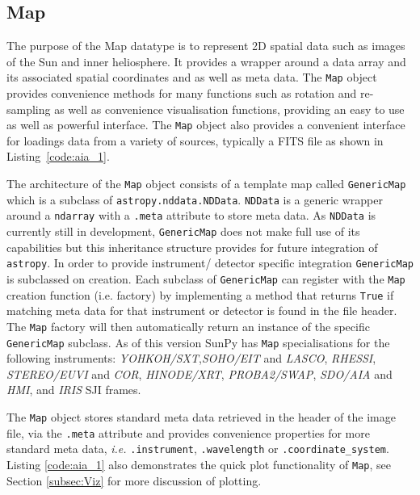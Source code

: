 \subsection{Map}
The purpose of the Map datatype is to represent 2D spatial data such as images of the Sun and 
inner heliosphere. It provides a wrapper around a data array and its associated
spatial coordinates and as well as meta data. The \texttt{Map} object provides 
convenience methods for many functions 
such as rotation and re-sampling as well as convenience visualisation 
functions, providing an easy to use as well as powerful interface. The \texttt{Map} object
also provides a convenient interface for loadings data from a variety of sources, typically
a FITS file as shown in Listing~\ref{code:aia_1}.

The architecture of the \texttt{Map} object consists of a template map called
\texttt{GenericMap} which is a subclass of \texttt{astropy.nddata.NDData}. \texttt{NDData} is a 
generic wrapper around a \texttt{ndarray} with a \texttt{.meta} attribute to store meta data.
As \texttt{NDData} is currently still in development, \texttt{GenericMap} does not make full
use of its capabilities but this inheritance structure provides 
for future integration of \texttt{astropy}. In order to provide instrument/
detector specific integration \texttt{GenericMap} is subclassed on creation. 
Each subclass of \texttt{GenericMap} can register with the \texttt{Map} creation function (i.e. factory)
by implementing a method that returns \texttt{True} if matching meta data 
for that instrument or detector is found in the file header. The \texttt{Map} factory 
will then automatically return an instance of the specific \texttt{GenericMap} 
subclass. As of this version SunPy has \texttt{Map} specialisations for the 
following instruments: 
\textit{YOHKOH/SXT},\textit{SOHO/EIT} and \textit{LASCO}, \textit{RHESSI}, 
\textit{STEREO/EUVI} and \textit{COR}, \textit{HINODE/XRT},
\textit{PROBA2/SWAP}, \textit{SDO/AIA} and \textit{HMI}, 
and \textit{IRIS} SJI frames. 

The \texttt{Map} object stores standard meta data retrieved in the header of 
the image file, via the \texttt{.meta} attribute and provides convenience 
properties for more standard meta data, \textit{i.e.} \texttt{.instrument}, 
\texttt{.wavelength} or \texttt{.coordinate\_system}. 
Listing \ref{code:aia_1} also demonstrates the quick plot functionality of 
\texttt{Map}, see Section \ref{subsec:Viz} for more discussion of plotting.

